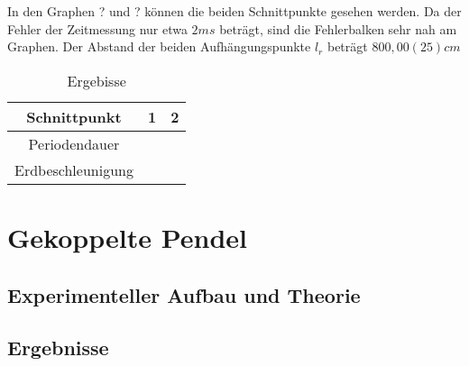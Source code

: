\documentclass[11pt, a4paper]{article}
\begin{document}
    In den Graphen ? und ? können die beiden Schnittpunkte gesehen werden. Da der Fehler der Zeitmessung
    nur etwa $2ms$ beträgt, sind die Fehlerbalken sehr nah am Graphen. Der Abstand der beiden
    Aufhängungspunkte $l_r$ beträgt $800,00(25)cm$

    \begin{table}
        \centering
        \begin{tabular}{c|c|c}
            Schnittpunkt & 1 & 2 \\ \hline
            Periodendauer & & \\ \hline
            Erdbeschleunigung & &
        \end{tabular}
        \caption{Ergebisse}
        \label{ergrev}
    \end{table}

    \section{Gekoppelte Pendel}

    \subsection{Experimenteller Aufbau und Theorie}



    \subsection{Ergebnisse}
\end{document}
